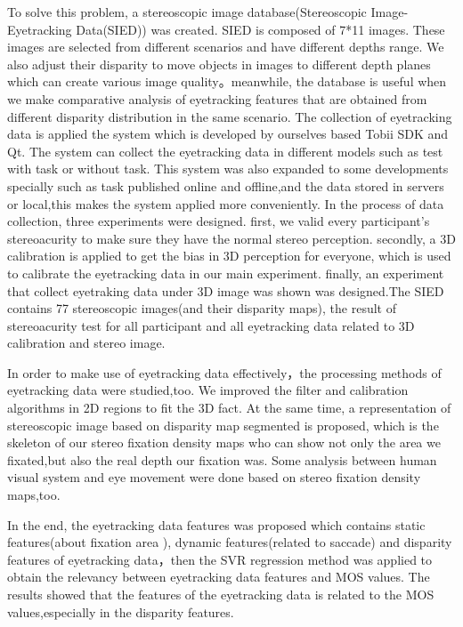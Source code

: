 \begin{englishabstract}
To solve this problem, a stereoscopic image database(Stereoscopic Image-Eyetracking Data(SIED)) was created. SIED is composed of 7*11 images. These images are selected from different scenarios and have different depths range. We also adjust their disparity to move objects in images to different depth planes which can create various image quality。meanwhile, the database is useful when we make comparative analysis of eyetracking features that are obtained from different disparity distribution in the same scenario. The collection of eyetracking data is applied the system which is developed by ourselves based Tobii SDK and Qt. The system can collect the eyetracking data  in different models such as test with task or without task. This system was also expanded to some developments specially such as task published online and offline,and the data stored in servers or local,this makes the system applied more conveniently.  In the process of data collection,  three experiments were designed. first, we valid every participant's stereoacurity to make sure they have the normal stereo perception. secondly,  a 3D calibration is applied to get the bias in 3D perception for everyone,  which is used to calibrate the eyetracking data in our main experiment. finally, an experiment that collect eyetraking data under 3D image was shown was designed.The SIED contains 77 stereoscopic images(and their disparity maps), the result of stereoacurity test for all participant and all eyetracking data related to 3D calibration and stereo image.

In order to make use of eyetracking data effectively，the processing methods of eyetracking data were studied,too. We improved the filter and calibration algorithms in 2D regions to fit the 3D fact. At the same time,  a representation of stereoscopic image based on disparity map segmented is proposed, which is the skeleton of our stereo fixation density maps who can show not only the area we fixated,but also the real depth our fixation was.  Some analysis between human visual system and eye movement were done based on stereo fixation density maps,too.

In the end, the eyetracking data features was proposed which contains static features(about fixation area ), dynamic features(related to saccade) and disparity features of eyetracking data，then the SVR regression method was applied to obtain the relevancy between eyetracking data features and MOS values. The results showed that the features of the eyetracking data is related to the MOS values,especially in the disparity features.

\end{englishabstract}

